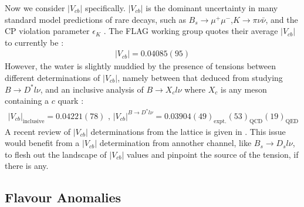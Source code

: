 Now we consider $|V_{cb}|$ specifically. $|V_{cb}|$ is the dominant uncertainty in many standard model predictions of rare decays, such as $B_s \to \mu^+\mu^-$,$K\to\pi\nu\bar{\nu}$, and the CP violation parameter $\epsilon_K$ \cite{Na:2015kha}. The FLAG working group quotes their average $|V_{cb}|$ to currently be \cite{Aoki:2016frl}:
\begin{align}
	|V_{cb}| = 0.04085(95)
\end{align}
However, the water is slightly muddied by the presence of tensions between different determinations of $|V_{cb}|$, namely between that deduced from studying $B\to D^*l\nu$, and an inclusive analysis of $B\to X_c l\nu$ where $X_c$ is any meson containing a $c$ quark \cite{Na:2015kha}:
\begin{align}
	|V_{cb}|_{\text{inclusive}} = 0.04221(78) \text{ , } |V_{cb}|^{B\to D^* l\nu} = 0.03904(49)_{\text{expt.}}(53)_{\text{QCD}}(19)_{\text{QED}}
\end{align}
A recent review of $|V_{cb}|$ determinations from the lattice is given in \cite{Wingate:2017unz}. This issue would benefit from a $|V_{cb}|$ determination from annother channel, like $B_s\to D_s l\nu$, to flesh out the landscape of $|V_{cb}|$ values and pinpoint the source of the tension, if there is any.

\subsection{Flavour Anomalies}

